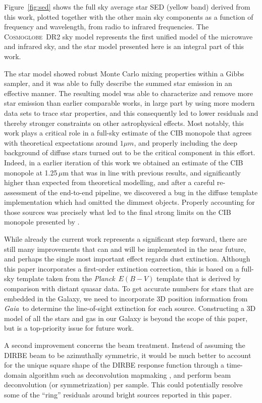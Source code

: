 \documentclass{aa}
\def\Cosmoglobe{\textsc{Cosmoglobe}}
\def\Planck{\textit{Planck}}
\def\gaia{\textit{Gaia}}
\begin{document}
Figure~\ref{fig:sed} shows the full sky average star SED (yellow band) derived from this work, plotted together with the other main sky components as a function of frequency and wavelength, from radio to infrared frequencies. The \Cosmoglobe\ DR2 sky model represents the first unified model of the microwave and infrared sky, and the star model presented here is an integral part of this work.

The star model showed robust Monte Carlo mixing properties within a Gibbs sampler, and it was able to fully describe the summed star emission in an effective manner. The resulting model was able to characterize and remove more star emission than earlier comparable works, in large part by using more modern data sets to trace star properties, and this consequently led to lower residuals and thereby stronger constraints on other astrophysical effects. Most notably, this work plays a critical role in a full-sky estimate of the CIB monopole that agrees with theoretical expectations around $1 \mu m$, and properly including the deep background of diffuse stars turned out to be the critical component in this effort. Indeed, in a earlier iteration of this work we obtained an estimate of the CIB monopole at 1.25\,$\mu$m that was in line with previous results, and significantly higher than expected from theoretical modelling, and after a careful re-assessment of the end-to-end pipeline, we discovered a bug in the diffuse template implementation which had omitted the dimmest objects. Properly accounting for those sources was precisely what led to the final strong limits on the CIB monopole presented by \citet{CG02_03}.

While already the current work represents a significant step forward, there are still many improvements that can and will be implemented in the near future, and perhaps the single most important effect regards dust extinction. Although this paper incorporates a first-order extinction correction, this is based on a full-sky template taken from the \Planck\ $E(B-V)$ template that is derived by comparison with distant quasar data. To get accurate numbers for stars that are embedded in the Galaxy, we need to incorporate 3D position information from \gaia\ to determine the line-of-sight extinction for each source. Constructing a 3D model of all the stars and gas in our Galaxy is beyond the scope of this paper, but is a top-priority issue for future work.

A second improvement concerns the beam treatment. Instead of assuming the DIRBE beam to be azimuthally symmetric, it would be much better to account for the unique square shape of the DIRBE response function through a time-domain algorithm such as deconvolution mapmaking \citep{artdeco}, and perform beam deconvolution (or symmetrization) per sample. This could potentially resolve some of the ``ring'' residuals around bright sources reported in this paper.
\end{document}
